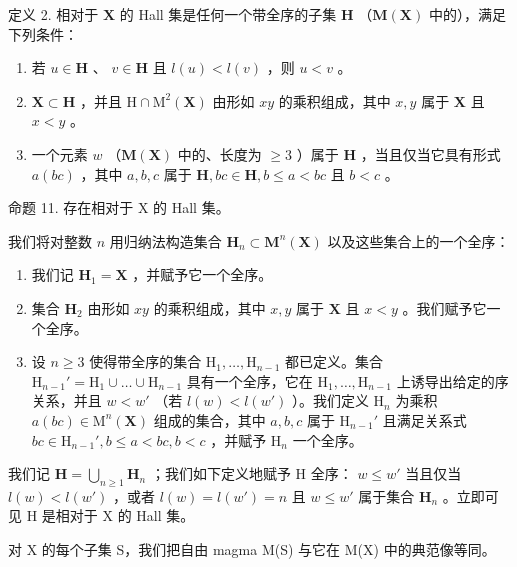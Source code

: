 定义 2. 相对于 \(\mathbf{X}\) 的 Hall 集是任何一个带全序的子集 \(\mathbf{H}\) （\(\mathbf{M}(\mathbf{X})\) 中的），满足下列条件：

\begin{enumerate}
\def\labelenumi{(\Alph{enumi})}
\item
  若 \(u \in \mathbf{H}\) 、 \(v \in \mathbf{H}\) 且 \(l(u) < l(v)\) ，则 \(u < v\) 。
\item
  \(\mathbf{X} \subset \mathbf{H}\) ，并且 \(\mathrm{H} \cap \mathrm{M}^2(\mathbf{X})\) 由形如 \(xy\) 的乘积组成，其中 \(x, y\) 属于 \(\mathbf{X}\) 且 \(x < y\) 。
\item
  一个元素 \(w\) （\(\mathbf{M}(\mathbf{X})\) 中的、长度为 \(\geqslant 3\) ）属于 \(\mathbf{H}\) ，当且仅当它具有形式 \(a(bc)\) ，其中 \(a, b, c\) 属于 \(\mathbf{H}, bc \in \mathbf{H}, b \leqslant a < bc\) 且 \(b < c\) 。
\end{enumerate}

命题 11. 存在相对于 X 的 Hall 集。

我们将对整数 \(n\) 用归纳法构造集合 \(\mathbf{H}_n \subset \mathbf{M}^n(\mathbf{X})\) 以及这些集合上的一个全序：

\begin{enumerate}
\def\labelenumi{(\alph{enumi})}
\item
  我们记 \(\mathbf{H}_1 = \mathbf{X}\) ，并赋予它一个全序。
\item
  集合 \(\mathbf{H}_2\) 由形如 \(xy\) 的乘积组成，其中 \(x, y\) 属于 \(\mathbf{X}\) 且 \(x < y\) 。我们赋予它一个全序。
\item
  设 \(n \geqslant 3\) 使得带全序的集合 \(\mathrm{H}_1, \ldots, \mathrm{H}_{n-1}\) 都已定义。集合 \(\mathrm{H}_{n-1}' = \mathrm{H}_1 \cup \dots \cup \mathrm{H}_{n-1}\) 具有一个全序，它在 \(\mathrm{H}_1, \ldots, \mathrm{H}_{n-1}\) 上诱导出给定的序关系，并且 \(w < w'\) （若 \(l(w) < l(w')\) ）。我们定义 \(\mathrm{H}_n\) 为乘积 \(a(bc) \in \mathrm{M}^n(\mathbf{X})\) 组成的集合，其中 \(a, b, c\) 属于 \(\mathrm{H}_{n-1}'\) 且满足关系式 \(bc \in \mathrm{H}_{n-1}', b \leqslant a < bc, b < c\) ，并赋予 \(\mathrm{H}_n\) 一个全序。
\end{enumerate}

我们记 \(\mathbf{H} = \bigcup_{n\geqslant 1}\mathbf{H}_n\) ；我们如下定义地赋予 H 全序： \(w\leqslant w'\) 当且仅当 \(l(w) < l(w')\) ，或者 \(l(w) = l(w') = n\) 且 \(w\leqslant w'\) 属于集合 \(\mathbf{H}_n\) 。立即可见 H 是相对于 X 的 Hall 集。

对 X 的每个子集 S，我们把自由 magma M(S) 与它在 M(X) 中的典范像等同。

